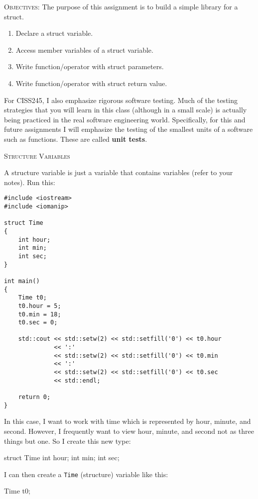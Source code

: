 


\topmatter

\textsc{Objectives:}
The purpose of this assignment is to build a simple library for a struct.
\begin{enumerate}[nosep]
\item Declare a struct variable.
\item Access member variables of a struct variable.
\item Write function/operator with struct parameters.
\item Write function/operator with struct return value.
\end{enumerate}

For CISS245, I also emphasize rigorous software testing. Much of the testing
strategies that you will learn in this class (although in a small scale) is
actually being practiced in the real software engineering world. Specifically,
for this and future assignments I will emphasize the testing of the smallest
units of a software such as functions. These are called \textbf{unit tests}.


\newpage
\textsc{Structure Variables}

A structure variable is just a variable that contains variables (refer to your
notes). Run this:
\begin{Verbatim}[frame=single,fontsize=\small]
#include <iostream>
#include <iomanip>

struct Time
{
    int hour;
    int min;
    int sec;
}

int main()
{
    Time t0;
    t0.hour = 5;
    t0.min = 18;
    t0.sec = 0;

    std::cout << std::setw(2) << std::setfill('0') << t0.hour
              << ':'
              << std::setw(2) << std::setfill('0') << t0.min
              << ':'
              << std::setw(2) << std::setfill('0') << t0.sec
              << std::endl;

    return 0;
}
\end{Verbatim}

In this case, I want to work with time which is represented by hour, minute,
and second. However, I frequently want to view hour, minute, and second not as
three things but one. So I create this new type:
\begin{console}[fontsize=\small]
struct Time
{
    int hour;
    int min;
    int sec;
}
\end{console}

I can then create a \verb!Time! (structure) variable like this:
\begin{console}[fontsize=\small]
Time t0;
\end{console}

